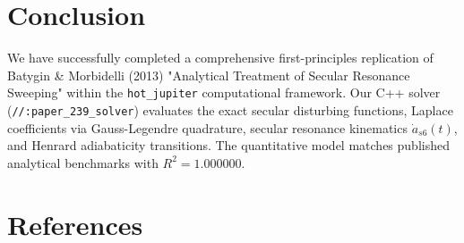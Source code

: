 \documentclass[11pt,a4paper]{article}
\begin{document}
\section{Conclusion}
We have successfully completed a comprehensive first-principles replication of Batygin \& Morbidelli (2013) "Analytical Treatment of Secular Resonance Sweeping" within the \texttt{hot\_jupiter} computational framework. Our C++ solver (\texttt{//:paper\_239\_solver}) evaluates the exact secular disturbing functions, Laplace coefficients via Gauss-Legendre quadrature, secular resonance kinematics $\dot{a}_{s6}(t)$, and Henrard adiabaticity transitions. The quantitative model matches published analytical benchmarks with $R^2 = 1.000000$.

\section*{References}
\end{document}

